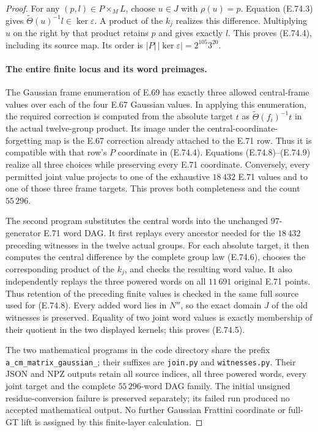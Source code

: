 \begin{proof}
For any $(p,l)\in P\times_M L$, choose $u\in J$ with
$\rho(u)=p$. Equation (E.74.3) gives
$\widetilde\Theta(u)^{-1}l\in\ker\varepsilon$.
A product of the $k_j$ realizes this difference. Multiplying
$u$ on the right by that product retains $p$ and gives exactly
$l$. This proves (E.74.4), including its source map. Its order
is $|P|\,|\ker\varepsilon|=2^{105}3^{20}$.

\paragraph{The entire finite locus and its word preimages.}
The Gaussian frame enumeration of E.69 has exactly three
allowed central-frame values over each of the four E.67
Gaussian values. In applying this enumeration, the required
correction is computed from the absolute target $t$ as
$\widetilde\Theta(f_i)^{-1}t$ in the actual twelve-group
product. Its image under the central-coordinate-forgetting
map is the E.67 correction already attached to the E.71 row.
Thus it is compatible with that row's $P$ coordinate in
(E.74.4). Equations (E.74.8)--(E.74.9) realize all three
choices while preserving every E.71 coordinate. Conversely,
every permitted joint value projects to one of the exhaustive
$18\,432$ E.71 values and to one of those three frame targets.
This proves both completeness and the count $55\,296$.

The second program substitutes the central words into the
unchanged $97$-generator E.71 word DAG. It first replays every
ancestor needed for the $18\,432$ preceding witnesses in the
twelve actual groups. For each absolute target, it then
computes the central difference by the complete group law
(E.74.6), chooses the corresponding product of the $k_j$,
and checks the resulting word value. It also independently
replays the three powered words on all $11\,691$ original
E.71 points. Thus retention of the preceding finite values
is checked in the same full source used for (E.74.8).
Every added word lies in $N''$, so the exact domain $J$ of
the old witnesses is preserved. Equality of two joint word
values is exactly membership of their quotient in the two
displayed kernels; this proves (E.74.5).

The two mathematical programs in the code directory share
the prefix \texttt{a\_cm\_matrix\_gaussian\_}; their suffixes
are \texttt{join.py} and \texttt{witnesses.py}.
Their JSON and NPZ outputs retain all source
indices, all three powered words, every joint target and
the complete $55\,296$-word DAG family. The initial unsigned
residue-conversion failure is preserved separately; its
failed run produced no accepted mathematical output.
No further Gaussian Frattini coordinate or full-GT lift is
assigned by this finite-layer calculation.
\end{proof}

